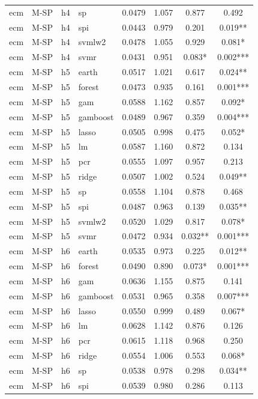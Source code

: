 \begin{ThreePartTable}
\begin{longtable}[t]{llclcccc}
ecm & M-SP & h4 & sp & 0.0479 & 1.057 & 0.877 & 0.492\\
ecm & M-SP & h4 & spi & 0.0443 & 0.979 & 0.201 & 0.019**\\
ecm & M-SP & h4 & svmlw2 & 0.0478 & 1.055 & 0.929 & 0.081*\\
ecm & M-SP & h4 & svmr & 0.0431 & 0.951 & 0.083* & 0.002***\\
\addlinespace
ecm & M-SP & h5 & earth & 0.0517 & 1.021 & 0.617 & 0.024**\\
ecm & M-SP & h5 & forest & 0.0473 & 0.935 & 0.161 & 0.001***\\
ecm & M-SP & h5 & gam & 0.0588 & 1.162 & 0.857 & 0.092*\\
ecm & M-SP & h5 & gamboost & 0.0489 & 0.967 & 0.359 & 0.004***\\
ecm & M-SP & h5 & lasso & 0.0505 & 0.998 & 0.475 & 0.052*\\
ecm & M-SP & h5 & lm & 0.0587 & 1.160 & 0.872 & 0.134\\
ecm & M-SP & h5 & pcr & 0.0555 & 1.097 & 0.957 & 0.213\\
ecm & M-SP & h5 & ridge & 0.0507 & 1.002 & 0.524 & 0.049**\\
ecm & M-SP & h5 & sp & 0.0558 & 1.104 & 0.878 & 0.468\\
ecm & M-SP & h5 & spi & 0.0487 & 0.963 & 0.139 & 0.035**\\
ecm & M-SP & h5 & svmlw2 & 0.0520 & 1.029 & 0.817 & 0.078*\\
ecm & M-SP & h5 & svmr & 0.0472 & 0.934 & 0.032** & 0.001***\\
\addlinespace
ecm & M-SP & h6 & earth & 0.0535 & 0.973 & 0.225 & 0.012**\\
ecm & M-SP & h6 & forest & 0.0490 & 0.890 & 0.073* & 0.001***\\
ecm & M-SP & h6 & gam & 0.0636 & 1.155 & 0.875 & 0.141\\
ecm & M-SP & h6 & gamboost & 0.0531 & 0.965 & 0.358 & 0.007***\\
ecm & M-SP & h6 & lasso & 0.0550 & 0.999 & 0.489 & 0.067*\\
ecm & M-SP & h6 & lm & 0.0628 & 1.142 & 0.876 & 0.126\\
ecm & M-SP & h6 & pcr & 0.0615 & 1.118 & 0.968 & 0.250\\
ecm & M-SP & h6 & ridge & 0.0554 & 1.006 & 0.553 & 0.068*\\
ecm & M-SP & h6 & sp & 0.0538 & 0.978 & 0.298 & 0.034**\\
ecm & M-SP & h6 & spi & 0.0539 & 0.980 & 0.286 & 0.113\\

\end{longtable}
\end{ThreePartTable}
